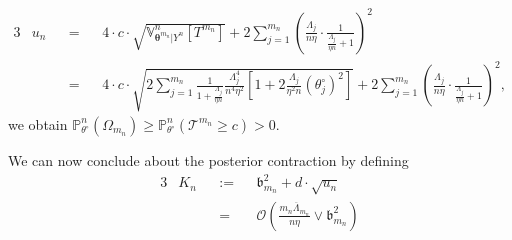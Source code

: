 {\begin{alignat*}{3}
&u_{n} &&=&& 4 \cdot c \cdot \sqrt{\mathds{V}_{\boldsymbol{\theta}^{m_{n}} \vert Y^{n}}^{n}\left[T^{m_{n}}\right]} + 2 \sum\limits_{j = 1}^{m_{n}}\left(\frac{\Lambda_{j}}{n \eta} \cdot \frac{1}{\frac{\Lambda_{j}}{\eta n} + 1}\right)^{2}\\
& &&=&& 4 \cdot c \cdot \sqrt{2 \sum\limits_{j = 1}^{m_{n}} \frac{1}{1 + \frac{\Lambda_{j}}{\eta n}}\frac{\Lambda_{j}^{4}}{n^{4} \eta^{2}}\left[1 + 2 \frac{\Lambda_{j}}{\eta^{2} n} \left(\theta^{\circ}_{j}\right)^{2}\right]} + 2 \sum\limits_{j = 1}^{m_{n}}\left(\frac{\Lambda_{j}}{n \eta} \cdot \frac{1}{\frac{\Lambda_{j}}{\eta n} + 1}\right)^{2},
\end{alignat*}
we obtain $\mathds{P}_{\theta^{\circ}}^{n}(\Omega_{m_{n}}) \geq \mathds{P}_{\theta^{\circ}}^{n}\left(\mathcal{T}^{m_{n}} \geq c \right) > 0$.
}

\medskip

We can now conclude about the posterior contraction by defining
\begin{alignat*}{3}
&K_{n} &&:=&& \mathfrak{b}_{m_{n}}^{2} + d \cdot \sqrt{u_{n}}\\
& &&=&& \mathcal{O}\left(\frac{m_{n} \overline{\Lambda}_{m_{n}}}{n \eta} \vee \mathfrak{b}_{m_{n}}^{2}\right)
\end{alignat*}


